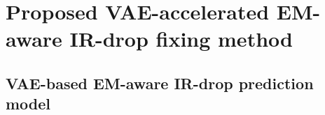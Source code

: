 \section{Proposed VAE-accelerated EM-aware IR-drop fixing method}
\label{sec:strategy}





\subsection{VAE-based EM-aware IR-drop prediction model}
\label{subsec:vae}







